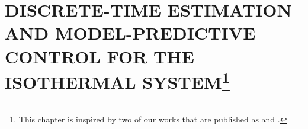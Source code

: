 \chapter[
    Discrete-time Estimation and Model-Predictive Control for the Isothermal System
]{
    \MakeUppercase{Discrete-time Estimation and Model-Predictive Control for the Isothermal System}\footnote{
        This chapter is inspired by two of our works that are published as  and .
    }}
\label{ch:2}





